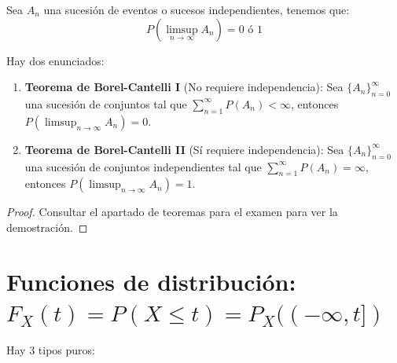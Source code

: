 \documentclass{apuntes}
\begin{document}
\begin{example}
Sea $A_n$ una sucesión de eventos o sucesos independientes, tenemos que:
\[
P(\limsup_{n \rightarrow \infty}A_n) = 0 \text{ ó } 1
\]
\end{example}

\begin{theorem}
Hay dos enunciados:
\begin{enumerate}
\item \textbf{Teorema de Borel-Cantelli I} (No requiere independencia): Sea $\{A_n\}_{n=0}^{\infty}$ una sucesión de conjuntos tal que $\sum_{n=1}^{\infty}P(A_n)< \infty$, entonces $P(\limsup_{n \rightarrow \infty}A_n)=0$.

\item \textbf{Teorema de Borel-Cantelli II} (Sí requiere independencia): Sea $\{A_n\}_{n=0}^{\infty}$ una sucesión de conjuntos independientes tal que $\sum_{n=1}^{\infty}P(A_n)= \infty$, entonces $P(\limsup_{n \rightarrow \infty}A_n)=1$.
\end{enumerate}
\end{theorem}
\begin{proof}
Consultar el apartado de teoremas para el examen para ver la demostración.
\end{proof}

\section{Funciones de distribución: $F_X(t)=P(X\leq t)=P_X((-\infty,t])$}
Hay 3 tipos puros:
\end{document}
